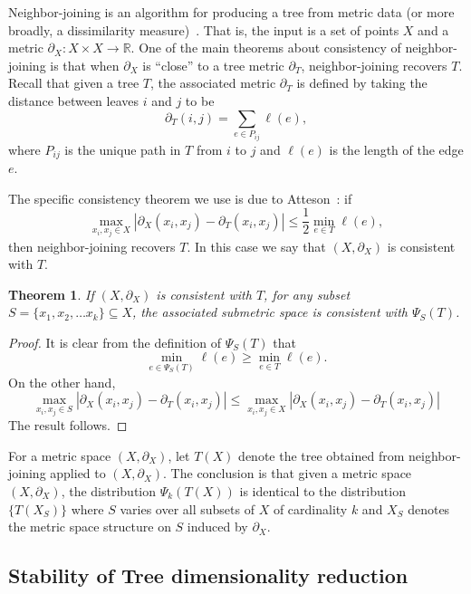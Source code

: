 \documentclass[a4paper,11pt]{article}
\newtheorem{theorem}{Theorem}
\begin{document}
Neighbor-joining is an algorithm for producing a tree from metric data (or more broadly, a dissimilarity measure)~\cite{}.
That is, the input is a set of points $X$ and a metric $\partial_X \colon X \times X \to \mathbb{R}$.
One of the main theorems about consistency of neighbor-joining is that when $\partial_X$ is ``close'' to a tree metric $\partial_T$, neighbor-joining recovers $T$.
Recall that given a tree $T$, the associated metric $\partial_T$ is defined by taking the distance between leaves $i$ and $j$ to be 
\[
\partial_T(i,j) = \sum_{e \in P_{ij}} \ell(e),
\]
where $P_{ij}$ is the unique path in $T$ from $i$ to $j$ and $\ell(e)$ is the length of the edge $e$.

The specific consistency theorem we use is due to Atteson~\cite{}: if
\[
\max_{x_i,x_j \in X} |\partial_X(x_i,x_j) - \partial_T(x_i,x_j)| \leq \frac{1}{2} \min_{e \in T} \ell(e),
\]
then neighbor-joining recovers $T$.
In this case we say that $(X, \partial_X)$ is consistent with $T$.

\begin{theorem}
If $(X,\partial_X)$ is consistent with $T$, for any subset $S = \{x_1, x_2, \ldots x_k\} \subseteq X$, the associated submetric space is consistent with $\Psi_S(T)$.
\end{theorem}

\begin{proof}
It is clear from the definition of $\Psi_S(T)$ that 
\[
\min_{e \in \Psi_S(T)} \ell(e) \geq \min_{e \in T} \ell(e).
\]
On the other hand, 
\[
\max_{x_i,x_j \in S} |\partial_X(x_i,x_j) - \partial_T(x_i,x_j)| \leq
\max_{x_i,x_j \in X} |\partial_X(x_i,x_j) - \partial_T(x_i,x_j)| 
\]
The result follows.
\end{proof}

For a metric space $(X,\partial_X)$, let $T(X)$ denote the tree obtained from neighbor-joining applied to $(X,\partial_X)$.
The conclusion is that given a metric space $(X, \partial_X)$, the distribution $\Psi_k(T(X))$ is identical to the distribution $\{T(X_S)\}$ where $S$ varies over all subsets of $X$ of cardinality $k$ and $X_S$ denotes the metric space structure on $S$ induced by $\partial_X$.


\subsection{Stability of Tree dimensionality reduction}
\end{document}
